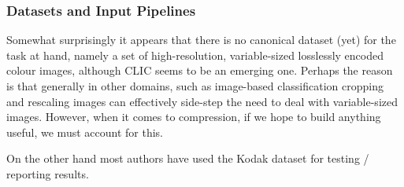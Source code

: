 \documentclass{article}
\begin{document}
\subsubsection{Datasets and Input Pipelines}
\par
Somewhat surprisingly it appears that there is no canonical dataset (yet) for
the task at hand, namely a set of high-resolution, variable-sized losslessly
encoded colour images,
although CLIC \cite{clic2018} seems to be an emerging one. Perhaps the reason is
that generally in other domains, such as image-based classification cropping and
rescaling images can effectively side-step the need to deal with variable-sized
images. However, when it comes to compression, if we hope to build anything
useful, we must account for this.
\par
On the other hand most authors have used the Kodak dataset \cite{kodakdataset}
for testing / reporting results.
\end{document}
